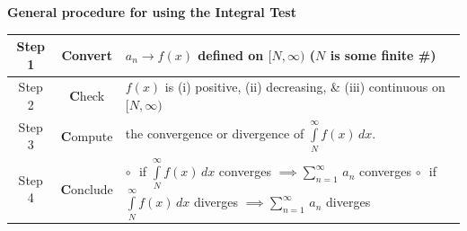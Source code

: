 \begin{frame}
\frametitle{}
\scriptsize
\begin{columns}
\begin{column}{12.0cm}

\vspace{0.1cm}

\begin{columns}\fcolorbox{blue}{white}{\begin{column}{10.4cm}
{\bf Integral Test for $\sum \limits_{n=1}^{\infty}\, a_n$}: \quad Let $f(x)$ be a function such that $f(n)=a_n$. \quad If 
\begin{itemize}
	\item[1.] \onslide<1->{\textcolor{blue}{positive on $[1,\infty)$\quad (or ``eventually'' positive)}}
	\vspace{0.2cm}
	\item[2.] \onslide<1->{\textcolor{blue}{continuous on $[1,\infty)$\quad (or ``eventually'' continuous)}}
	\vspace{0.2cm}
	\item[3.] \onslide<1->{\textcolor{blue}{decreasing on $[1,\infty)$\quad (or ``eventually'' decreasing)}}
\end{itemize}
Then\\
\vspace{0.2cm}
$\D{\int \limits_{1}^{\infty} f(x) \, dx \quad \text{converges} \quad \implies \quad  \sum \limits_{n=1}^{\infty}\, a_n}$ \quad \text{\onslide<2->{\textcolor{blue}{converges}}} \qquad or\\
\vspace{0.1cm}
$\D{\int \limits_{1}^{\infty} f(x) \, dx \quad \text{diverges} \quad \implies \quad  \sum \limits_{n=1}^{\infty}\, a_n}$ \quad \text{\onslide<3->{\textcolor{blue}{diverges}}}\\
\end{column}}\begin{column}{0.0cm}\end{column}\end{columns}
\vspace{0.2cm}
{\bf General procedure for using the Integral Test}
\centering
	\begin{tabular}{| c | c | p{7.6cm} |}
		\hline
		Step 1 & {\bf C}onvert & $a_n \to f(x)$ defined on $[N,\infty)$ \quad ($N$ is some finite \#) \\
		\hline
	 	Step 2 & {\bf C}heck & $f(x)$ is (i) positive, (ii) decreasing, \& (iii) continuous on $[N,\infty)$\\
		\hline
		Step 3 & {\bf C}ompute & the convergence or divergence of $\int \limits_{N}^{\infty} f(x) \, dx$.\\
		\hline
		Step 4 & {\bf C}onclude & $\circ$\,\, if $\int \limits_{N}^{\infty} f(x) \, dx$ converges $\implies \sum \limits_{n=1}^{\infty}\, a_n$ converges \newline $\circ$\,\, if $\int \limits_{N}^{\infty} f(x) \, dx$ diverges $\implies \sum \limits_{n=1}^{\infty}\, a_n$ diverges  \\
		\hline
	\end{tabular}


\end{column}
\end{columns}
\end{frame}
